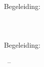 
\begin{titlepage}

    \begin{addmargin}[-1cm]{-3cm}
        \begin{center}
            \large

            \hfill
            \vfill

            \begingroup
            \color[HTML]{27406B}\spacedallcaps{\myTitle} \\ \bigskip %

            \color[HTML]{84C6C8}\mySubtitle \\ \medskip
            \endgroup

            \spacedlowsmallcaps{\myName} %

            \vfill


            \myworkName \\
            \myworkAddress \\
            \myworkPostcodeCity \\
            Begeleiding: \myStagebegeleider \\
            \bigskip \bigskip \bigskip
            \myDepartment \\
            \myFaculty \\
            \myUni \\
            Begeleiding: \myHvABegeleider \\ \bigskip \bigskip \bigskip


            \myTime\ -- \myVersion %

            \vfill

        \end{center}
    \end{addmargin}

\end{titlepage}
